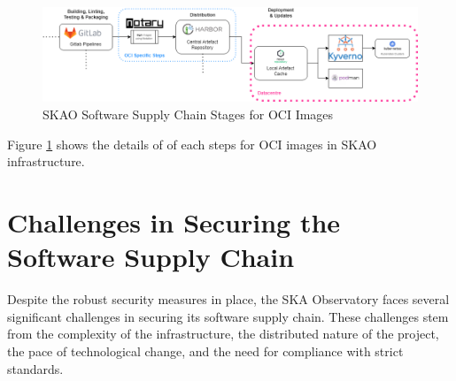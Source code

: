 \documentclass[a4paper]{spie}  %
\begin{document}
   \begin{figure} [ht]
   \begin{center}
   \includegraphics[width=\textwidth,height=\textheight,keepaspectratio]{ssc_oci.png}
   \end{center}
   \caption 
   { \label{fig:ssc_oci}
SKAO Software Supply Chain Stages for OCI Images}
    \end{figure} 

Figure \ref{fig:ssc_oci} shows the details of of each steps for OCI images in SKAO infrastructure.

\section{Challenges in Securing the Software Supply Chain}

Despite the robust security measures in place, the SKA Observatory faces several significant challenges in securing its software supply chain. These challenges stem from the complexity of the infrastructure, the distributed nature of the project, the pace of technological change, and the need for compliance with strict standards.
\end{document}
